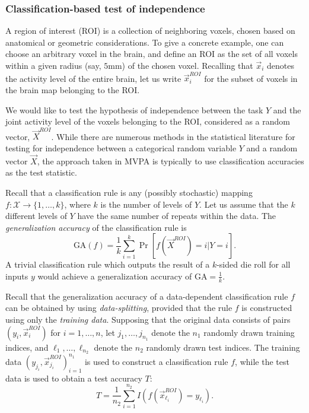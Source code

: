 \subsubsection{Classification-based test of independence}

A region of interest (ROI) is a collection of neighboring voxels,
chosen based on anatomical or geometric considerations.  To give a
concrete example, one can choose an arbitrary voxel in the brain, and
define an ROI as the set of all voxels within a given radius (say, $5
\text{mm}$) of the chosen voxel.  Recalling that $\vec{x}_i$ denotes
the activity level of the entire brain, let us write $\vec{x}_i^{ROI}$
for the subset of voxels in the brain map belonging to the ROI.

We would like to test the hypothesis of independence between the task
$Y$ and the joint activity level of the voxels belonging to the ROI,
considered as a random vector, $\vec{X}^{ROI}$.  While there are
numerous methods in the statistical literature for testing for
independence between a categorical random variable $Y$ and a random
vector $\vec{X}$, the approach taken in MVPA is typically to use
classification accuracies as the test statistic.

Recall that a classification rule is any (possibly stochastic) mapping
$f: \mathcal{X} \to \{1,\hdots, k\}$, where $k$ is the number of
levels of $Y$.  Let us assume that the $k$ different levels of $Y$
have the same number of repeats within the data.  The
\emph{generalization accuracy} of the classification rule is
\[
\text{GA}(f) = \frac{1}{k} \sum_{i=1}^k\Pr[f(\vec{X}^{ROI}) = i | Y = i].
\]
A trivial classification rule which outputs the result of a $k$-sided
die roll for all inputs $y$ would achieve a generalization accuracy of
$\text{GA} = \frac{1}{k}$.

Recall that the generalization accuracy of a data-dependent
classification rule $f$ can be obtained by using
\emph{data-splitting}, provided that the rule $f$ is constructed using
only the \emph{training data}.  Supposing that the original data
consists of pairs $(y_i,\vec{x}_i^{ROI})$ for $i = 1,\hdots, n$, let
$j_1,\hdots, j_{n_1}$ denote the $n_1$ randomly drawn training
indices, and $\ell_1,\hdots, \ell_{n_2}$ denote the $n_2$ randomly
drawn test indices.  The training data $(y_{j_i},
\vec{x}_{j_i}^{ROI})_{i=1}^{n_1}$ is used to construct a classification rule
$f$, while the test data is used to obtain a test accuracy $T$:
\[
T= \frac{1}{n_2} \sum_{i=1}^{n_2} I(f(\vec{x}_{\ell_i}^{ROI}) = y_{\ell_i}).
\]

